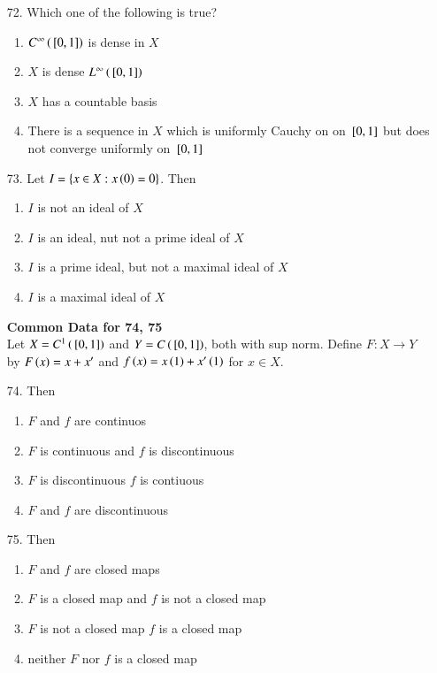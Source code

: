 \documentclass[journal,12pt,onecolumn]{IEEEtran}
\theoremstyle{remark}
\begin{document}
\begin{enumerate}
	\item[72.] Which one of the following is true?

		\hfill{}
		\begin{enumerate}
            \item $C^{\infty}\left({}\left[0, 1\right]\right)$ is dense in $X$
            \item $X$ is dense $L^{\infty}\left({}\left[0, 1\right]\right)$
			\item $X$ has a countable basis
            \item There is a sequence in $X$ which is uniformly Cauchy on on ${}\left[0, 1\right]$ but does not converge uniformly on ${}\left[0, 1\right]$
		\end{enumerate}

    \item[73.] Let $I = \left\{x \in X : x\left(0\right) = 0\right\}$. Then 
		
		\hfill{}
		\begin{enumerate}
			\item $I$ is not an ideal of $X$
			\item $I$ is an ideal, nut not a prime ideal of $X$
			\item $I$ is a prime ideal, but not a maximal ideal of $X$
			\item $I$ is a maximal ideal of $X$
		\end{enumerate}


        \textbf{Common Data for 74, 75}\\
        Let $X = C^1\left({}\left[0, 1\right]\right)$ and $Y = C\left({}\left[0, 1\right]\right)$, both with sup norm. Define
        $F : X \rightarrow Y$ by $F\left(x\right) = x + x^{\prime}$ and $f\left(x\right) = x\left(1\right) + x^{\prime}\left(1\right)$
        for $x \in X$.
	\item[74.] Then
		\hfill{}
\begin{enumerate}
			\item $F$ and $f$ are continuos
			\item $F$ is continuous and $f$ is discontinuous
			\item $F$ is discontinuous $f$ is contiuous
			\item $F$ and $f$ are discontinuous
		\end{enumerate}
\item[75.] Then
		\hfill{}
\begin{enumerate}
			\item $F$ and $f$ are closed maps
			\item $F$ is a closed map and $f$ is not a closed map 
			\item $F$ is not a closed map $f$ is a closed map
			\item neither $F$ nor $f$ is a closed map
		\end{enumerate}
        

\end{enumerate}
\end{document}
